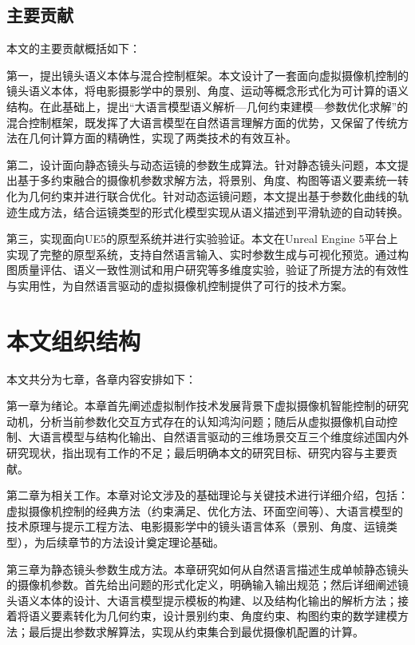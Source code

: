 \subsection{主要贡献}

本文的主要贡献概括如下：

第一，提出镜头语义本体与混合控制框架。本文设计了一套面向虚拟摄像机控制的镜头语义本体，将电影摄影学中的景别、角度、运动等概念形式化为可计算的语义结构。在此基础上，提出“大语言模型语义解析—几何约束建模—参数优化求解”的混合控制框架，既发挥了大语言模型在自然语言理解方面的优势，又保留了传统方法在几何计算方面的精确性，实现了两类技术的有效互补。

第二，设计面向静态镜头与动态运镜的参数生成算法。针对静态镜头问题，本文提出基于多约束融合的摄像机参数求解方法，将景别、角度、构图等语义要素统一转化为几何约束并进行联合优化。针对动态运镜问题，本文提出基于参数化曲线的轨迹生成方法，结合运镜类型的形式化模型实现从语义描述到平滑轨迹的自动转换。

第三，实现面向UE5的原型系统并进行实验验证。本文在Unreal Engine 5平台上实现了完整的原型系统，支持自然语言输入、实时参数生成与可视化预览。通过构图质量评估、语义一致性测试和用户研究等多维度实验，验证了所提方法的有效性与实用性，为自然语言驱动的虚拟摄像机控制提供了可行的技术方案。

\section{本文组织结构}

本文共分为七章，各章内容安排如下：

第一章为绪论。本章首先阐述虚拟制作技术发展背景下虚拟摄像机智能控制的研究动机，分析当前参数化交互方式存在的认知鸿沟问题；随后从虚拟摄像机自动控制、大语言模型与结构化输出、自然语言驱动的三维场景交互三个维度综述国内外研究现状，指出现有工作的不足；最后明确本文的研究目标、研究内容与主要贡献。

第二章为相关工作。本章对论文涉及的基础理论与关键技术进行详细介绍，包括：虚拟摄像机控制的经典方法（约束满足、优化方法、环面空间等）、大语言模型的技术原理与提示工程方法、电影摄影学中的镜头语言体系（景别、角度、运镜类型），为后续章节的方法设计奠定理论基础。

第三章为静态镜头参数生成方法。本章研究如何从自然语言描述生成单帧静态镜头的摄像机参数。首先给出问题的形式化定义，明确输入输出规范；然后详细阐述镜头语义本体的设计、大语言模型提示模板的构建、以及结构化输出的解析方法；接着将语义要素转化为几何约束，设计景别约束、角度约束、构图约束的数学建模方法；最后提出参数求解算法，实现从约束集合到最优摄像机配置的计算。


